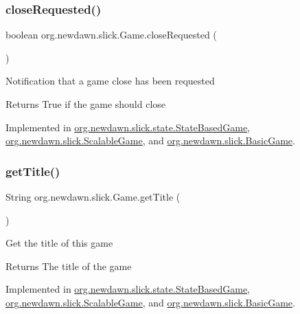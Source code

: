 \subsubsection{\texorpdfstring{close\+Requested()}{closeRequested()}}
{\footnotesize\ttfamily boolean org.\+newdawn.\+slick.\+Game.\+close\+Requested (\begin{DoxyParamCaption}{ }\end{DoxyParamCaption})}

Notification that a game close has been requested

\begin{DoxyReturn}{Returns}
True if the game should close 
\end{DoxyReturn}


Implemented in \mbox{\hyperlink{classorg_1_1newdawn_1_1slick_1_1state_1_1_state_based_game_af31408ebd2398cc30cbf77a3580cc3f3}{org.\+newdawn.\+slick.\+state.\+State\+Based\+Game}}, \mbox{\hyperlink{classorg_1_1newdawn_1_1slick_1_1_scalable_game_ad9a8b81977a256601f21e9574bb1d386}{org.\+newdawn.\+slick.\+Scalable\+Game}}, and \mbox{\hyperlink{classorg_1_1newdawn_1_1slick_1_1_basic_game_a84830b3b65ccbc59e0050f5332bd4a3b}{org.\+newdawn.\+slick.\+Basic\+Game}}.

\mbox{\label{interfaceorg_1_1newdawn_1_1slick_1_1_game_ae02a95991618c4aec2038d8d482be0d2}} 
\subsubsection{\texorpdfstring{get\+Title()}{getTitle()}}
{\footnotesize\ttfamily String org.\+newdawn.\+slick.\+Game.\+get\+Title (\begin{DoxyParamCaption}{ }\end{DoxyParamCaption})}

Get the title of this game

\begin{DoxyReturn}{Returns}
The title of the game 
\end{DoxyReturn}


Implemented in \mbox{\hyperlink{classorg_1_1newdawn_1_1slick_1_1state_1_1_state_based_game_a03a2277e7ca503ffd922b68b497f8d5b}{org.\+newdawn.\+slick.\+state.\+State\+Based\+Game}}, \mbox{\hyperlink{classorg_1_1newdawn_1_1slick_1_1_scalable_game_a34d2611a0e2650677e76e8f7df5d3c6a}{org.\+newdawn.\+slick.\+Scalable\+Game}}, and \mbox{\hyperlink{classorg_1_1newdawn_1_1slick_1_1_basic_game_aa0f5bd5f0a628ed27a9d39d759ade637}{org.\+newdawn.\+slick.\+Basic\+Game}}.

